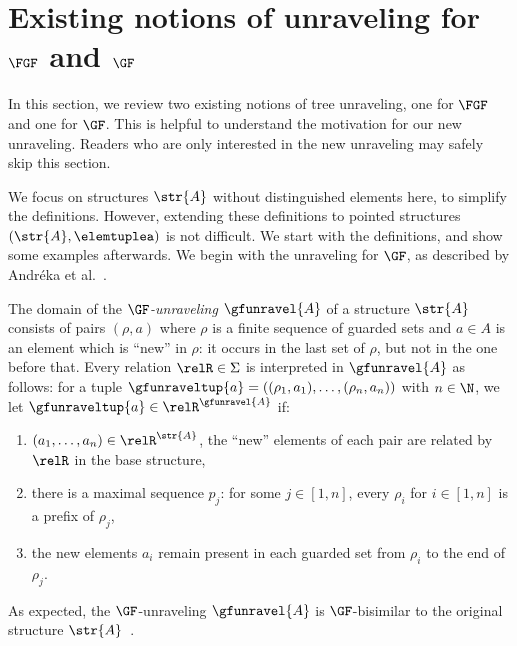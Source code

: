 \section{Existing notions of unraveling for $\FGF$ and $\GF$}\label{sec:existing-unravelings}
In this section, we review two existing notions of tree unraveling, one for $\FGF$ and one for $\GF$.
This is helpful to understand the motivation for our new unraveling.
Readers who are only interested in the new unraveling may safely skip this section.

We focus on structures $\str{A}$ without distinguished elements here, to simplify the definitions.
However, extending these definitions to pointed structures $(\str{A}, \elemtuplea)$ is not difficult.
We start with the definitions, and show some examples afterwards.
We begin with the unraveling for $\GF$, as described by Andréka et al.~\cite[Sec 4.3, p. 247]{AndrekaNB98}.
\begin{definition}[$\GF$-unraveling]
  The domain of the \emph{$\GF$-unraveling} $\gfunravel{A}$ of a structure $\str{A}$ consists of pairs $(\rho, a)$ where $\rho$ is a finite sequence of guarded sets and $a \in A$ is an element which is ``new'' in $\rho$: it occurs in the last set of $\rho$, but not in the one before that.
  Every relation $\relR \in \Sigma$ is interpreted in $\gfunravel{A}$ as follows: for a tuple $\gfunraveltup{a} = ((\rho_{1}, a_{1}), \ldots, (\rho_{n}, a_{n}))$ with $n \in \N$, we let $\gfunraveltup{a} \in \relR^{\gfunravel{A}}$ if:
  \begin{enumerate}
    \item $(a_{1}, \ldots, a_{n}) \in \relR^{\str{A}}$, \ie{} the ``new'' elements of each pair are related by $\relR$ in the base structure,
    \item there is a maximal sequence $p_{j}$: for some $j \in [1,n]$, every $\rho_{i}$ for $i \in [1,n]$ is a prefix of $\rho_{j}$,
    \item the new elements $a_{i}$ remain present in each guarded set from $\rho_{i}$ to the end of $\rho_{j}$.
  \end{enumerate}
\end{definition}
As expected, the $\GF$-unraveling $\gfunravel{A}$ is $\GF$-bisimilar to the original structure $\str{A}$~\cite[Proposition 4.3.1]{AndrekaNB98}.

